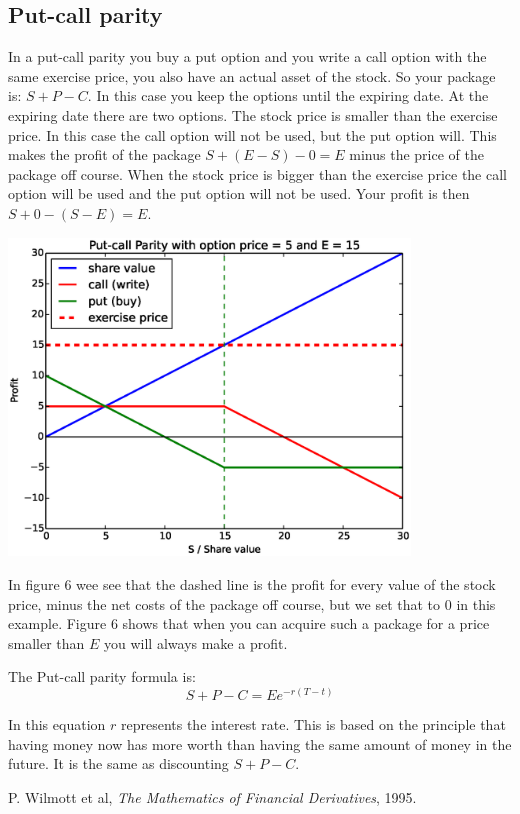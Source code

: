 \documentclass[8 pt]{article}
\newenvironment{Figure}
  {\par\medskip\noindent\minipage{\linewidth}}
  {\endminipage\par\medskip}
\begin{document}
\begin{multicols*}{2}
\section{Put-call parity}
In a put-call parity you buy a put option and you write a call option with the same exercise price, you also have an actual asset of the stock. So your package is: $S + P - C$. In this case you keep the options until the expiring date. At the expiring date there are two options. The stock price is smaller than the exercise price. In this case the call option will not be used, but the put option will. This makes the profit of the package $S + (E-S) - 0 = E$ minus the price of the package off course. When the stock price is bigger than the exercise price the call option will be used and the put option will not be used. Your profit is then $S + 0 -(S-E) = E$.
\begin{Figure}
  \begin{center}
    \includegraphics[width=0.8\textwidth]{graphs/put_call_parity.eps}
    \label{fig:put_call_parity}
  \end{center}
\end{Figure}
In figure 6 wee see that the dashed line is the profit for every value of the stock price, minus the net costs of the package off course, but we set that to 0 in this example. Figure 6 shows that when you can acquire such a package for a price smaller than $E$ you will always make a profit. 

The Put-call parity formula is:
\begin{equation}
    S + P - C = Ee^{-r(T-t)}
\end{equation}

In this equation $r$ represents the interest rate. This is based on the principle that having money now has more worth than having the same amount of money in the future. It is the same as discounting $S + P - C$.
\end{multicols*}

\begin{thebibliography}{28}
\raggedright
{}

 P. Wilmott et al, \emph{The Mathematics of Financial Derivatives}, 1995.

\end{thebibliography}
\end{document}
